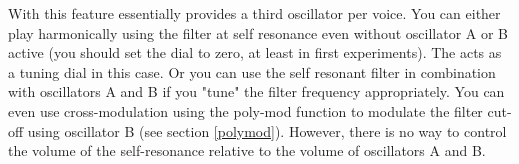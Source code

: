 With this feature essentially provides a third oscillator per voice. You can either play harmonically using the filter at self resonance even without oscillator A or B active (you should set the \filterenv dial to zero, at least in first experiments). The \filtercutoff acts as a tuning dial in this case. Or you can use the self resonant filter in combination with oscillators A and B if you "tune" the filter frequency appropriately. You can even use cross-modulation using the poly-mod function to modulate the filter cut-off using oscillator B (see section \ref{polymod}). However, there is no way to control the volume of the self-resonance relative to the volume of oscillators A and B.   
